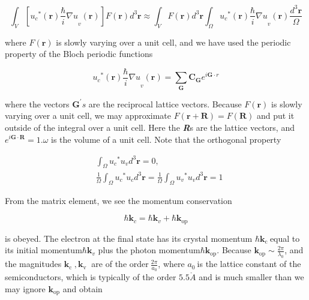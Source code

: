\begin{equation}
\int_{V}^{}\left\lbrack {u_{c}}^{*}\left( \bm{r} \right){\frac{\hbar}{i}\nabla u}_{v}\left( \bm{r} \right) \right\rbrack F(\bm{r})d^{3}\bm{r \approx}\int_{V}^{}{F(\bm{r})}d^{3}\bm{r}\int_{\Omega}^{}{{u_{c}}^{*}(\bm{r}){\frac{\hbar}{i}\nabla u}_{v}(\bm{r})}\frac{d^{3}\bm{r}}{\Omega}
\end{equation}

where \(F(\bm{r})\) is slowly varying over a unit cell, and we have
used the periodic property of the Bloch periodic functions

\begin{equation}
{u_{c}}^{*}\left( \bm{r} \right){\frac{\hbar}{i}\nabla u}_{v}\left( \bm{r} \right) = \sum_{\bm{G}}^{}{\bm{C}_{\bm{G}}e^{i\bm{G} \cdot r}}
\end{equation}

where the vectors \(\bm{G}^{\bm{'}}s\) are the reciprocal
lattice vectors. Because \(F\left( \bm{r} \right)\) is slowly
varying over a unit cell, we may approximate
\(F\left( \bm{r + R} \right) = F\left( \bm{R} \right)\) and put
it outside of the integral over a unit cell. Here the \emph{\textbf{R}}s
are the lattice vectors, and
\(e^{i\bm{G} \cdot \bm{R}} = 1\).\(\omega\) is the volume
of a unit cell. Note that the orthogonal property

\begin{eqnarray}
  & \int_{\Omega}^{}{{u_{c}}^{*}u_{v}d^{3}\bm{r} = 0}, \nonumber \\
  & \frac{1}{\Omega}\int_{\Omega}^{}{{u_{c}}^{*}u_{c}d^{3}\bm{r} = \frac{1}{\Omega}\int_{\Omega}^{}{{u_{v}}^{*}u_{v}d^{3}\bm{r} = 1}}
\end{eqnarray}

From the matrix element, we see the momentum conservation

\begin{equation}
\hbar\bm{k}_{c} = \hbar\bm{k}_{v} + \hbar\bm{k}_{\text{op}}
\end{equation}

is obeyed. The electron at the final state has its crystal momentum
\(\hbar\bm{k}_{\text{c\ }}\)equal to its initial momentum\(\hbar\bm{k}_{v}\)
plus the photon momentum\(\hbar\bm{k}_{\text{op}}\). Because
\(\bm{k}_{\text{op}}\sim\frac{2\pi}{\lambda_{0}}\), and the magnitudes
\(\bm{k}_{\text{c\ }},\bm{k}_{\text{v\ }}\) are of the order\(\
\frac{2\pi}{a_{0}}\), where \(a_{0}\ \)is the lattice constant of the
semiconductors, which is typically of the order $5.5\mathring{A}$  and is much
smaller than we may ignore \(\bm{k}_{\text{op}}\) and obtain


